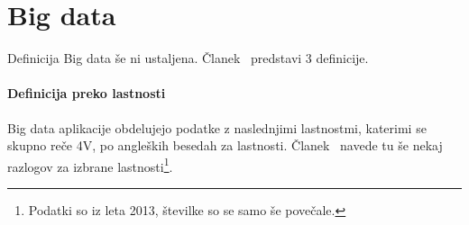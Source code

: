 \section{Big data} \label{sec:big-data}

Definicija Big data še ni ustaljena.
Članek~\cite{toward_scalable_systems_big_data_analytics} predstavi 3 definicije.

\paragraph{Definicija preko lastnosti}
Big data aplikacije obdelujejo podatke z naslednjimi lastnostmi, katerimi se
skupno reče 4V, po angleških besedah za lastnosti.
Članek~\cite{modeling_requirements_big_data} navede tu še nekaj razlogov za izbrane
lastnosti\footnote{Podatki so iz leta 2013, številke so se samo še povečale.}.

